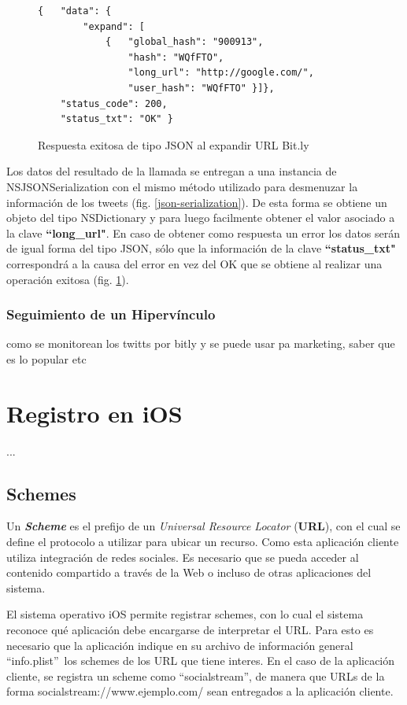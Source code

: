 \begin{figure}[H]
	\centering
\begin{lstlisting}
{   "data": {
        "expand": [
            { 	"global_hash": "900913",
                "hash": "WQfFTO",
                "long_url": "http://google.com/",
                "user_hash": "WQfFTO" }]},
    "status_code": 200,
    "status_txt": "OK" }
\end{lstlisting}
	\caption{Respuesta exitosa de tipo JSON al expandir URL Bit.ly}
	\label{bitly-json-response}
\end{figure}	
Los datos del resultado de la llamada se entregan a una instancia de NSJSONSerialization con el mismo método utilizado para desmenuzar la información de los tweets (fig. \ref{json-serialization}). De esta forma se obtiene un objeto del tipo NSDictionary y para luego facilmente obtener el valor asociado a la clave \textbf{\textquotedblleft long\_url"}.
En caso de obtener como respuesta un error los datos serán de igual forma del tipo JSON, sólo que la información de la clave \textbf{\textquotedblleft status\_txt"} correspondrá a la causa del error en vez del OK que se obtiene al realizar una operación exitosa (fig. \ref{bitly-json-response}).

		\subsubsection{Seguimiento de un Hipervínculo}		
		como se monitorean los twitts por bitly y se puede usar pa marketing, saber que es lo popular etc		

\clearpage
\section{Registro en iOS}
...
	\subsection{Schemes}
	Un \textbf{\textit{Scheme}} es el prefijo de un \textit{Universal Resource Locator} (\textbf{URL}), con el cual se define el protocolo a utilizar para ubicar un recurso.
Como esta aplicación cliente utiliza integración de redes sociales. Es necesario que se pueda acceder al contenido compartido a través de la Web o incluso de otras aplicaciones del sistema.

El sistema operativo iOS permite registrar schemes, con lo cual el sistema reconoce qué aplicación debe encargarse de interpretar el URL. Para esto es necesario que la aplicación indique en su archivo de información general \textquotedblleft info.plist\textquotedblright  \ los schemes de los URL que tiene interes.
En el caso de la aplicación cliente, se registra un scheme como \textquotedblleft socialstream\textquotedblright , de manera que URLs de la forma socialstream://www.ejemplo.com/ sean entregados a la aplicación cliente.


